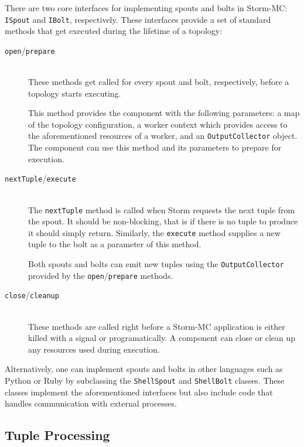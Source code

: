 \documentclass[bsc,deptreport,twoside,singlespacing,normalheadings,parskip]{infthesis}\usepackage[]{graphicx}\usepackage[]{color}
\begin{document}
There are two core interfaces for implementing spouts and bolts in Storm-MC: \texttt{ISpout} and \texttt{IBolt}, respectively. These interfaces provide a set of standard methods that get executed during the lifetime of a topology:

\begin{description}
	\item[\texttt{open}/\texttt{prepare}] \hfill \\
	These methods get called for every spout and bolt, respectively, before a topology starts executing.

	This method provides the component with the following parameters: a map of the topology configuration, a worker context which provides access to the aforementioned resources of a worker, and an \texttt{OutputCollector} object. The component can use this method and its parameters to prepare for execution.

	\item[\texttt{nextTuple}/\texttt{execute}] \hfill \\
	The \texttt{nextTuple} method is called when Storm requests the next tuple from the spout. It should be non-blocking, that is if there is no tuple to produce it should simply return. Similarly, the \texttt{execute} method supplies a new tuple to the bolt as a parameter of this method.

	Both spouts and bolts can emit new tuples using the \texttt{OutputCollector} provided by the \texttt{open}/\texttt{prepare} methods.

	\item[\texttt{close}/\texttt{cleanup}] \hfill \\
	These methods are called right before a Storm-MC application is either killed with a signal or programatically. A component can close or clean up any resources used during execution.
\end{description}

Alternatively, one can implement spouts and bolts in other languages such as Python or Ruby by subclassing the \texttt{ShellSpout} and \texttt{ShellBolt} classes. These classes implement the aforementioned interfaces but also include code that handles communication with external processes.

\subsection{Tuple Processing}
\end{document}
